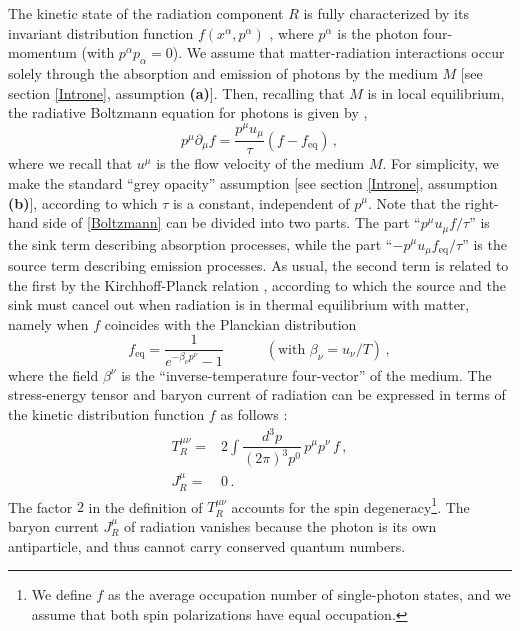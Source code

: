 \documentclass[a4paper, amsfonts, amssymb, amsmath, reprint, showkeys, nofootinbib, twoside,notitlepage,onecolumn]{revtex4-2}
\newcommand{\spc}{\quad \quad \quad}
\theoremstyle{definition}
\theoremstyle{theorem}
\theoremstyle{corollary}
\begin{document}
The kinetic state of the radiation component $R$ is fully characterized by its invariant distribution function $f(x^\alpha,p^\alpha)$ \cite{MTW_book}, where $p^\alpha$ is the photon four-momentum (with $p^\alpha p_\alpha=0$).
We assume that matter-radiation interactions occur solely through the absorption and emission of photons by the medium $M$ [see section \ref{Introne}, assumption \textbf{(a)}]. Then, recalling that $M$ is in local equilibrium, the radiative Boltzmann equation for photons is given by \cite[\S 92]{mihalas_book},
\begin{equation}\label{Boltzmann}
p^\mu \partial_\mu f = \dfrac{p^\mu u_\mu}{\tau} (f-f_{\text{eq}}) \, ,
\end{equation}
where we recall that $u^\mu$ is the flow velocity of the medium $M$. For simplicity, we make the standard ``grey opacity'' assumption [see section \ref{Introne}, assumption \textbf{(b)}], according to which $\tau$ is a constant, independent of $p^\mu$. Note that the right-hand side of \eqref{Boltzmann} can be divided into two parts. The part ``$p^\mu u_\mu f/\tau $'' is the sink term describing absorption processes, while the part ``$-p^\mu u_\mu f_{\text{eq}}/\tau$'' is the source term describing emission processes. As usual, the second term is related to the first by the Kirchhoff-Planck relation \cite[\S 72]{mihalas_book}, according to which the source and the sink must cancel out when radiation is in thermal equilibrium with matter, namely when $f$ coincides with the Planckian distribution
\begin{equation}\label{equilub}
    f_\text{eq}= \dfrac{1}{e^{-\beta_\nu p^\nu} -1}   \spc (\text{with }\beta_\nu=u_\nu/T) \, ,
\end{equation}
where the field $\beta^\nu$ is the ``inverse-temperature four-vector'' \cite{Israel_Stewart_1979,BecattiniBeta2016,GavassinoTermometri} of the medium. 
The stress-energy tensor and baryon current of radiation can be expressed in terms of the kinetic distribution function $f$ as follows \cite[\S 91]{mihalas_book}\cite[\S 6.3]{CastorRadiationBook_2004}:
\begin{equation}\label{stressOne}
\begin{split}
T_R^{\mu \nu} ={}& 2 \int \dfrac{d^3 p}{(2\pi)^3 p^0} \, p^\mu p^\nu \, f \, , \\
J_R^\mu ={}& 0 \, .
\end{split}
\end{equation}
The factor $2$ in the definition of $T_R^{\mu \nu}$ accounts for the spin degeneracy\footnote{We define $f$ as the average occupation number of single-photon states, and we assume that both spin polarizations have equal occupation.}. The baryon current $J_R^\mu$ of radiation vanishes because the photon is its own antiparticle, and thus cannot carry conserved quantum numbers. 
\end{document}
